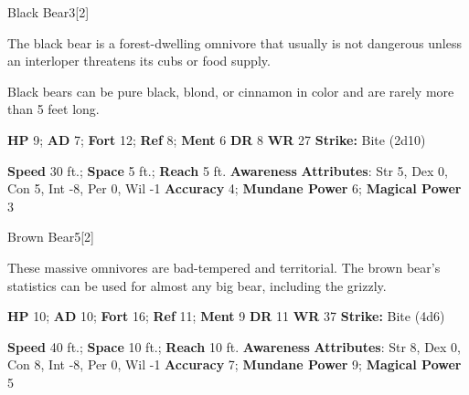   \begin{monsection}{Black Bear}{3}[2]
    \vspace{-1em}\vspace{-1em}
    \vspace{0em}

    
      The black bear is a forest-dwelling omnivore that usually is not dangerous unless an interloper threatens its cubs or food supply.

      Black bears can be pure black, blond, or cinnamon in color and are rarely more than 5 feet long.
    

    \begin{spellcontent}
      \begin{spelltargetinginfo}
        \pari \textbf{HP} 9;
          \textbf{AD} 7;
          \textbf{Fort} 12;
          \textbf{Ref} 8;
          \textbf{Ment} 6
        \pari \textbf{DR} 8
        \pari \textbf{WR} 27
        \pari \textbf{Strike:}
            Bite  (2d10)
      \end{spelltargetinginfo}
    \end{spellcontent}
    \begin{monsterfooter}
      \pari \textbf{Speed} 30 ft.;
        \textbf{Space} 5 ft.;
        \textbf{Reach} 5 ft.
      \pari \textbf{Awareness} 
      \pari \textbf{Attributes}:
        Str 5, Dex 0,
        Con 5, Int -8,
        Per 0, Wil -1
      \pari \textbf{Accuracy} 4;
        \textbf{Mundane Power} 6;
      \textbf{Magical Power} 3
    \end{monsterfooter}
  \end{monsection}
  
  
  \begin{monsection}{Brown Bear}{5}[2]
    \vspace{-1em}\vspace{-1em}
    \vspace{0em}

    
      These massive omnivores are bad-tempered and territorial.
      The brown bear's statistics can be used for almost any big bear, including the grizzly.
    

    \begin{spellcontent}
      \begin{spelltargetinginfo}
        \pari \textbf{HP} 10;
          \textbf{AD} 10;
          \textbf{Fort} 16;
          \textbf{Ref} 11;
          \textbf{Ment} 9
        \pari \textbf{DR} 11
        \pari \textbf{WR} 37
        \pari \textbf{Strike:}
            Bite  (4d6)
      \end{spelltargetinginfo}
    \end{spellcontent}
    \begin{monsterfooter}
      \pari \textbf{Speed} 40 ft.;
        \textbf{Space} 10 ft.;
        \textbf{Reach} 10 ft.
      \pari \textbf{Awareness} 
      \pari \textbf{Attributes}:
        Str 8, Dex 0,
        Con 8, Int -8,
        Per 0, Wil -1
      \pari \textbf{Accuracy} 7;
        \textbf{Mundane Power} 9;
      \textbf{Magical Power} 5
    \end{monsterfooter}
  \end{monsection}
  
